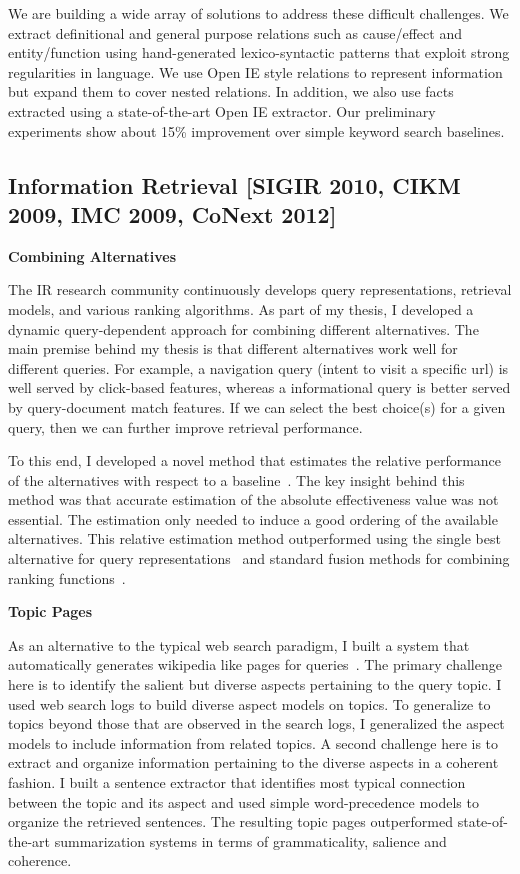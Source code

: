\documentclass[a4paper,11pt,onecolumn]{article}
\begin{document}
We are building a wide array of solutions to address these difficult challenges. We extract definitional and general purpose relations such as cause/effect and entity/function using hand-generated lexico-syntactic patterns that exploit strong regularities in language. We use Open IE style relations to represent information but expand them to cover nested relations. In addition, we also use facts extracted using a state-of-the-art Open IE extractor. Our preliminary experiments show about 15\% improvement over simple keyword search baselines.

\subsection*{Information Retrieval [SIGIR 2010, CIKM 2009, IMC 2009, CoNext 2012]}

{\bf Combining Alternatives}

The IR research community continuously develops query representations, retrieval models, and various ranking algorithms. As part of my thesis, I developed a dynamic query-dependent approach for combining different alternatives. The main premise behind my thesis is that different alternatives work well for different queries. For example, a navigation query (intent to visit a specific url) is well served by click-based features, whereas a informational query is better served by query-document match features. If we can select the best choice(s) for a given query, then we can further improve retrieval performance. 

To this end, I developed a novel method that estimates the relative performance of the alternatives with respect to a baseline~\cite{balasubramanian-sigir10a}. The key insight behind this method was that accurate estimation of the absolute effectiveness value was not essential. The estimation only needed to induce a good ordering of the available alternatives. This relative estimation method outperformed using the single best alternative for query representations~\cite{balasubramanian-sigir10b} and standard fusion methods for combining ranking functions~\cite{balasubramanian-sigir10c, balasubramanian-tr11}. 

{\bf Topic Pages}

As an alternative to the typical web search paradigm, I built a system that automatically generates wikipedia like pages for queries~\cite{balasubramanian-icsc2010}. The primary challenge here is to identify the salient but diverse aspects pertaining to the query topic. I used web search logs to build diverse aspect models on topics. To generalize to topics beyond those that are observed in the search logs, I generalized the aspect models to include information from related topics. A second challenge here is to extract and organize information pertaining to the diverse aspects in a coherent fashion. I built a sentence extractor that identifies most typical connection between the topic and its aspect and used simple word-precedence models to organize the retrieved sentences. The resulting topic pages outperformed state-of-the-art summarization systems in terms of grammaticality, salience and coherence.
\end{document}
